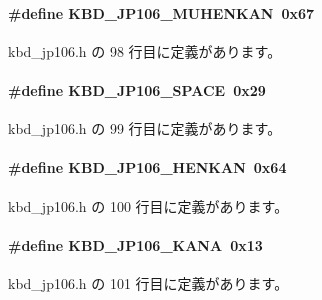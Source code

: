 \paragraph[{K\+B\+D\+\_\+\+J\+P106\+\_\+\+M\+U\+H\+E\+N\+K\+A\+N}]{\setlength{\rightskip}{0pt plus 5cm}\#define K\+B\+D\+\_\+\+J\+P106\+\_\+\+M\+U\+H\+E\+N\+K\+A\+N~0x67}\label{kbd__jp106_8h_abc9fec2af13aceb8a55d6b2f1a8365c9_abc9fec2af13aceb8a55d6b2f1a8365c9}


 kbd\+\_\+jp106.\+h の 98 行目に定義があります。

\paragraph[{K\+B\+D\+\_\+\+J\+P106\+\_\+\+S\+P\+A\+C\+E}]{\setlength{\rightskip}{0pt plus 5cm}\#define K\+B\+D\+\_\+\+J\+P106\+\_\+\+S\+P\+A\+C\+E~0x29}\label{kbd__jp106_8h_a7269b56b895cff49c5a37236b81d5c5d_a7269b56b895cff49c5a37236b81d5c5d}


 kbd\+\_\+jp106.\+h の 99 行目に定義があります。

\paragraph[{K\+B\+D\+\_\+\+J\+P106\+\_\+\+H\+E\+N\+K\+A\+N}]{\setlength{\rightskip}{0pt plus 5cm}\#define K\+B\+D\+\_\+\+J\+P106\+\_\+\+H\+E\+N\+K\+A\+N~0x64}\label{kbd__jp106_8h_a02518d53b74bc906c88115386e99605a_a02518d53b74bc906c88115386e99605a}


 kbd\+\_\+jp106.\+h の 100 行目に定義があります。

\paragraph[{K\+B\+D\+\_\+\+J\+P106\+\_\+\+K\+A\+N\+A}]{\setlength{\rightskip}{0pt plus 5cm}\#define K\+B\+D\+\_\+\+J\+P106\+\_\+\+K\+A\+N\+A~0x13}\label{kbd__jp106_8h_ae7ab5a1feec3630856436e22cc45cb62_ae7ab5a1feec3630856436e22cc45cb62}


 kbd\+\_\+jp106.\+h の 101 行目に定義があります。

